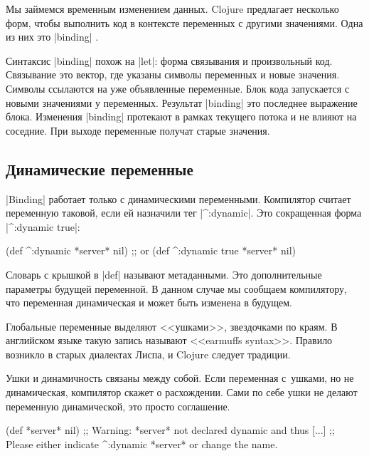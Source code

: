 Мы займемся временным изменением данных. Clojure предлагает несколько форм,
чтобы выполнить код в контексте переменных с другими значениями. Одна из них это
\spverb|binding| .

Синтаксис \spverb|binding| похож на \spverb|let|: форма связывания и
произвольный код. Связывание это вектор, где указаны символы переменных и новые
значения. Символы ссылаются на уже объявленные переменные. Блок кода запускается
с новыми значениями у переменных. Результат \spverb|binding| это последнее
выражение блока. Изменения \spverb|binding| протекают в рамках текущего потока и
не влияют на соседние. При выходе переменные получат старые значения.

\subsection{Динамические переменные}

\label{dynamic-vars}

\spverb|Binding| работает только с динамическими переменными. Компилятор считает
переменную таковой, если ей назначили тег \spverb|^:dynamic|. Это сокращенная
форма \spverb|^{:dynamic true}|:

\begin{english}
  \begin{clojure}
(def ^:dynamic *server* nil)
;; or
(def ^{:dynamic true} *server* nil)
  \end{clojure}
\end{english}

Словарь с крышкой в \spverb|def| называют метаданными. Это дополнительные
параметры будущей переменной. В данном случае мы сообщаем компилятору, что
переменная динамическая и может быть изменена в будущем.

Глобальные переменные выделяют <<ушками>>, звездочками по краям. В
английском языке такую запись называют <<earmuffs syntax>>. Правило возникло в
старых диалектах Лиспа, и Clojure следует традиции.

Ушки и динамичность связаны между собой. Если переменная с~ушками, но не
динамическая, компилятор скажет о расхождении. Сами по себе ушки не делают
переменную динамической, это просто соглашение.

\begin{english}
  \begin{clojure}
(def *server* nil)
;; Warning: *server* not declared dynamic and thus [...]
;; Please either indicate ^:dynamic *server* or change the name.
  \end{clojure}
\end{english}

